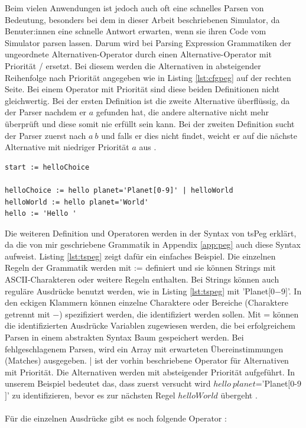 \documentclass[a4paper, 11pt, onecolumn]{article}
\begin{document}
Beim vielen Anwendungen ist jedoch auch oft eine schnelles Parsen von Bedeutung, besonders bei dem in dieser Arbeit beschriebenen Simulator, da Benuter:innen eine schnelle Antwort erwarten, wenn sie ihren Code vom Simulator parsen lassen. Darum wird bei Parsing Expression Grammatiken der ungeordnete Alternativen-Operator durch einen Alternative-Operator mit Priorität / ersetzt. Bei diesem werden die Alternativen in absteigender Reihenfolge nach Priorität angegeben wie in Listing \ref{lst:cfgpeg} auf der rechten Seite. Bei einem Operator mit Priorität sind diese beiden Definitionen nicht gleichwertig. Bei der ersten Definition ist die zweite Alternative überflüssig, da der Parser nachdem er $a$ gefunden hat, die andere alternative nicht mehr überprüft und diese somit nie erfüllt sein kann. Bei der zweiten Definition sucht der Parser zuerst nach $a~b$ und falls er dies nicht findet, weicht er auf die nächste Alternative mit niedriger Priorität $a$ aus \cite{peg}.\\

\begin{lstlisting}[basicstyle=\ttfamily\footnotesize, backgroundcolor=\color{backcolour}, caption={Angepasstes Hello World Beispiel für tsPEG \cite{tspeg}},captionpos=b, label={lst:tspeg}]
start := helloChoice

helloChoice := hello planet='Planet[0-9]' | helloWorld
helloWorld := hello planet='World'
hello := 'Hello '
\end{lstlisting}

Die weiteren Definition und Operatoren werden in der Syntax von tsPeg erklärt, da die von mir geschriebene Grammatik in Appendix \ref{app:peg} auch diese Syntax aufweist. Listing \ref{lst:tspeg} zeigt dafür ein einfaches Beispiel. Die einzelnen Regeln der Grammatik werden mit := definiert und sie können Strings mit ASCII-Charakteren oder weitere Regeln enthalten. Bei Strings können auch reguläre Ausdrücke benutzt werden, wie in Listing \ref{lst:tspeg} mit 'Planet$[$0$-$9$]$'. In den eckigen Klammern können einzelne Charaktere oder Bereiche (Charaktere getrennt mit $-$) spezifiziert werden, die identifiziert werden sollen. Mit = können die identifizierten Ausdrücke Variablen zugewiesen werden, die bei erfolgreichem Parsen in einem abstrakten Syntax Baum gespeichert werden. Bei fehlgeschlagenem Parsen, wird ein Array mit erwarteten Übereinstimmungen (Matches) ausgegeben. | ist der vorhin beschriebene Operator für Alternativen mit Priorität. Die Alternativen werden mit absteigender Priorität aufgeführt. In unserem Beispiel bedeutet das, dass zuerst versucht wird $hello~planet$='Planet$[$0-9$]$' zu identifizieren, bevor es zur nächsten Regel $helloWorld$ übergeht \cite{tspeg}.\\ \\
Für die einzelnen Ausdrücke gibt es noch folgende Operator \cite{tspeg}:
\end{document}
